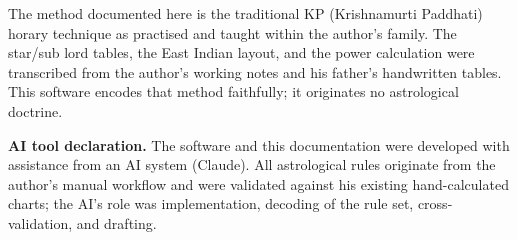 \documentclass[11pt, a4paper]{article}
\begin{document}
The method documented here is the traditional KP (Krishnamurti Paddhati)
horary technique as practised and taught within the author's family. The
star/sub lord tables, the East Indian layout, and the power calculation were
transcribed from the author's working notes and his father's handwritten
tables. This software encodes that method faithfully; it originates no
astrological doctrine.

\vspace{1em}
\begin{notebox}
\small \textbf{AI tool declaration.} The software and this documentation were
developed with assistance from an AI system (Claude). All astrological rules
originate from the author's manual workflow and were validated against his
existing hand-calculated charts; the AI's role was implementation, decoding of
the rule set, cross-validation, and drafting.
\end{notebox}
\end{document}
